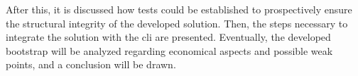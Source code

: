 After this, it is discussed how tests could be established to prospectively ensure the structural integrity of the developed solution.
Then, the steps necessary to integrate the solution with the \ac{cli} are presented.
Eventually, the developed bootstrap will be analyzed regarding economical aspects and possible weak points, and a conclusion will be drawn.